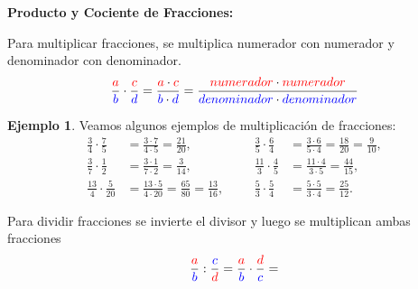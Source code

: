 \documentclass[12pt]{examdesign}
\theoremstyle{plain}
\theoremstyle{definition}
\newtheorem{exa}[theorem]{Ejemplo}
\theoremstyle{remark}
\begin{document}
	\begin{endmatter}
		\centerline{\LARGE \textcolor{upforestgreen}{\textbf{Producto y Cociente de Fracciones:}}}
		\vspace{.2cm}
		\begin{tcolorbox}[colback=red!10!white, colframe=tealgreen, title=\textbf{Producto de Fracciones:}]
			Para multiplicar fracciones, se multiplica numerador con numerador y denominador con denominador. 
			\begin{equation}
			\frac{\textcolor{red}{a}}{\textcolor{blue}{b}}\cdot \frac{\textcolor{red}{c}}{\textcolor{blue}{d}}=
			\frac{\textcolor{red}{a}\cdot \textcolor{red}{c}}{\textcolor{blue}{b}\cdot \textcolor{blue}{d}}   =
			\frac{\textcolor{red}{numerador}\cdot \textcolor{red}{numerador}}{\textcolor{blue}{denominador}\cdot \textcolor{blue}{denominador}}
			\end{equation}
			\end{tcolorbox}
			\vspace{.1cm}
			\begin{exa}
				Veamos algunos ejemplos de multiplicación de fracciones:
				\begin{align*}
				\frac{3}{4}\cdot\frac{7}{5}   &= \frac{3\cdot 7}{4\cdot5}    = \frac{21}{20},                 &&&
				\frac{3}{5}\cdot\frac{6}{4}   &= \frac{3\cdot 6}{5\cdot 4}   = \frac{18}{20} = \frac{9}{10},
				\\[0.2cm]
				\frac{3}{7}\cdot\frac{1}{2}   &= \frac{3\cdot 1}{7\cdot 2}   = \frac{3}{14},                  &&&
				\frac{11}{3}\cdot\frac{4}{5}  &= \frac{11\cdot 4}{3\cdot 5}  = \frac{44}{15},
				\\[0.2cm]
				\frac{13}{4}\cdot\frac{5}{20} &= \frac{13\cdot 5}{4\cdot 20} = \frac{65}{80} = \frac{13}{16}, &&&
				\frac{5}{3}\cdot\frac{5}{4}   &= \frac{5\cdot 5}{3\cdot4}    = \frac{25}{12}.
				\end{align*}
			\end{exa}
			\vspace{.1cm}
			\begin{tcolorbox}[colback=red!10!white, colframe=tealgreen, title=\textbf{Cociente de Fracciones:}]
				Para dividir fracciones se invierte el divisor y luego se multiplican ambas fracciones
				\begin{align*}
				\frac{\textcolor{red}{a}}{\textcolor{blue}{b}}: \frac{\textcolor{blue}{c}}{\textcolor{red}{d}}=
				\frac{\textcolor{red}{a}}{\textcolor{blue}{b}}\cdot \frac{\textcolor{red}{d}}{\textcolor{blue}{c}}=

\end{align*}
\end{tcolorbox}
\end{endmatter}
\end{document}

